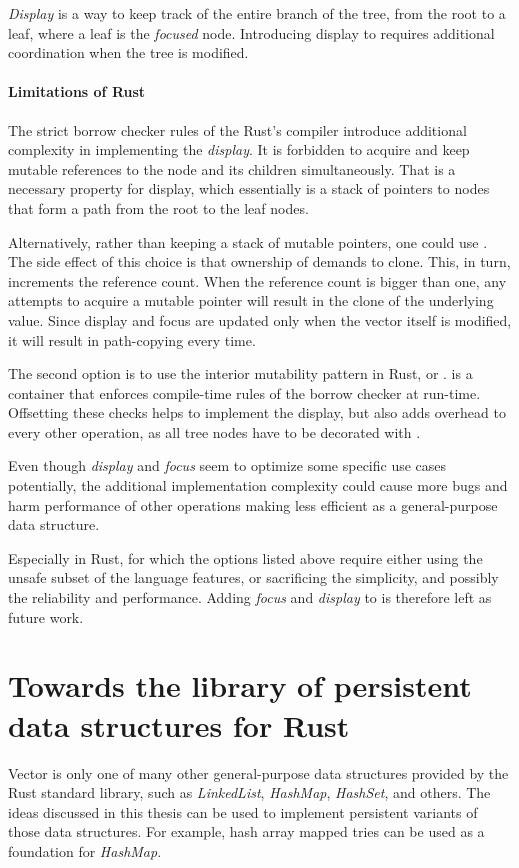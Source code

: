 \emph{Display} is a way to keep track of the entire branch of the tree, from the root to a leaf, where a leaf is the \emph{focused} node. Introducing display to \rrbtree{} requires additional coordination when the tree is modified. 

\paragraph{Limitations of Rust}
The strict borrow checker rules of the Rust's compiler introduce additional complexity in implementing the \emph{display}. It is forbidden to acquire and keep mutable references to the node and its children simultaneously. That is a necessary property for display, which essentially is a stack of pointers to nodes that form a path from the root to the leaf nodes. 

Alternatively, rather than keeping a stack of mutable pointers, one could use \rc{}. The side effect of this choice is that ownership of \rc{} demands to clone. This, in turn, increments the reference count. When the reference count is bigger than one, any attempts to acquire a mutable pointer will result in the clone of the underlying value. Since display and focus are updated only when the vector itself is modified, it will result in path-copying every time.

The second option is to use the interior mutability pattern in Rust, or .  is a container that enforces compile-time rules of the borrow checker at run-time. Offsetting these checks helps to implement the display, but also adds overhead to every other operation, as all tree nodes have to be decorated with .  

Even though \emph{display} and \emph{focus} seem to optimize some specific use cases potentially, the additional implementation complexity could cause more bugs and harm performance of other operations making \rrbtree{} less efficient as a general-purpose data structure. 

Especially in Rust, for which the options listed above require either using the unsafe subset of the language features, or sacrificing the simplicity, and possibly the reliability and performance. Adding \emph{focus} and \emph{display} to \rrbvec{} is therefore left as future work.

\section{Towards the library of persistent data structures for Rust}
Vector is only one of many other general-purpose data structures provided by the Rust standard library, such as \emph{LinkedList}, \emph{HashMap}, \emph{HashSet}, and others. The ideas discussed in this thesis can be used to implement persistent variants of those data structures. For example, hash array mapped tries\cite{ideal-hash-trees} can be used as a foundation for \emph{HashMap}. 

